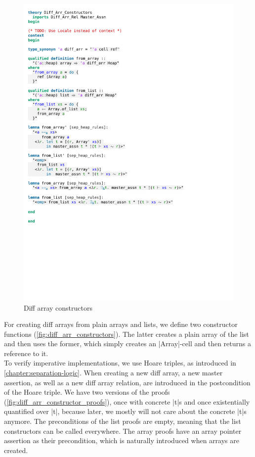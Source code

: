 \begin{figure}[htpb]
    \includegraphics[trim={0 18cm 0 5,2cm}, clip, width=1.00\textwidth]{figures/Theory_Diff_Arr_Constructors.pdf}
    \caption[Diff array constructors]{Diff array constructors}
    \label{fig:diff_arr_constructors}
\end{figure}

\noindent For creating diff arrays from plain arrays and lists, we define two constructor functions (\autoref{fig:diff_arr_constructors}). The latter creates a plain array of the list and then uses the former, which simply creates an |Array|-cell and then returns a reference to it.\\
To verify imperative implementations, we use Hoare triples, as introduced in \autoref{chapter:separation-logic}. When creating a new diff array, a new master assertion, as well as a new diff array relation, are introduced in the postcondition of the Hoare triple. We have two versions of the proofs (\autoref{fig:diff_arr_constructor_proofs}), once with concrete |t|s and once existentially quantified over |t|, because later, we mostly will not care about the concrete |t|s anymore. The preconditions of the list proofs are empty, meaning that the list constructors can be called everywhere. The array proofs have an array pointer assertion as their precondition, which is naturally introduced when arrays are created.

